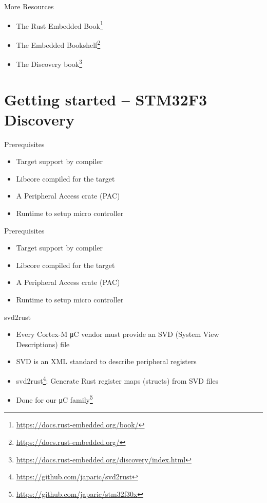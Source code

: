 \documentclass[aspectratio=1610,14pt,t]{beamer}
\begin{document}
\begin{frame}[c]{More Resources}
  \begin{itemize}
    \item The Rust Embedded Book\footnote{\url{https://docs.rust-embedded.org/book/}}
    \item The Embedded Bookshelf\footnote{\url{https://docs.rust-embedded.org/}}
    \item The Discovery book\footnote{\url{https://docs.rust-embedded.org/discovery/index.html}}
  \end{itemize}
\end{frame}

\section{Getting started – STM32F3 Discovery}

\begin{frame}[c]{Prerequisites}
  \begin{itemize}
    \item \Square Target support by compiler
    \item \Square Libcore compiled for the target
    \item \Square A Peripheral Access crate (PAC)
    \item \Square Runtime to setup micro controller
  \end{itemize}
\end{frame}

\begin{frame}[c]{Prerequisites}
  \begin{itemize}
    \item \CheckedBox Target support by compiler
    \item \CheckedBox Libcore compiled for the target
    \item \Square A Peripheral Access crate (PAC)
    \item \Square Runtime to setup micro controller
  \end{itemize}
\end{frame}

\begin{frame}[c]{svd2rust}
  \begin{itemize}
    \item Every Cortex-M μC vendor must provide an SVD (System View
      Descriptions) file
    \item SVD is an XML standard to describe peripheral registers
    \item svd2rust\footnote{\url{https://github.com/japaric/svd2rust}}:
      Generate Rust register maps (structs) from SVD files
    \item Done for our μC family\footnote{\url{https://github.com/japaric/stm32f30x}}
  \end{itemize}
\end{frame}
\end{document}
